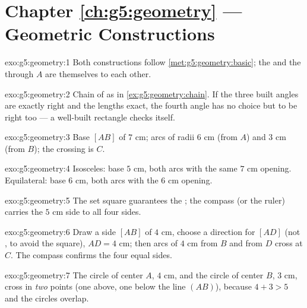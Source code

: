 \section*{Chapter \ref{ch:g5:geometry} --- Geometric Constructions}

\begin{solution}{exo:g5:geometry:1}
Both constructions follow \cref{met:g5:geometry:basic}; the
 and the  through $A$ are themselves
 to each other.
\end{solution}

\begin{solution}{exo:g5:geometry:2}
Chain of  as in \cref{ex:g5:geometry:chain}. If the
three built angles are exactly right and the lengths exact, the
fourth angle has no choice but to be right too --- a well-built
rectangle checks itself.
\end{solution}

\begin{solution}{exo:g5:geometry:3}
Base $[AB]$ of $7$ cm; arcs of radii $6$ cm (from $A$) and $3$ cm
(from $B$); the crossing is $C$.
\end{solution}

\begin{solution}{exo:g5:geometry:4}
Isosceles: base $5$ cm, both arcs with the same $7$ cm opening.
Equilateral: base $6$ cm, both arcs with the $6$ cm opening.
\end{solution}

\begin{solution}{exo:g5:geometry:5}
The set square guarantees the ; the compass (or the
ruler) carries the $5$ cm side to all four sides.
\end{solution}

\begin{solution}{exo:g5:geometry:6}
Draw a side $[AB]$ of $4$ cm, choose a direction for $[AD]$ (not
, to avoid the square), $AD = 4$ cm; then arcs of
$4$ cm from $B$ and from $D$ cross at $C$. The compass confirms the
four equal sides.
\end{solution}

\begin{solution}{exo:g5:geometry:7}
The circle of center $A$,  $4$ cm, and the circle of center
$B$,  $3$ cm, cross in \emph{two} points (one above, one below
the line $(AB)$), because $4 + 3 > 5$ and the circles overlap.
\end{solution}

